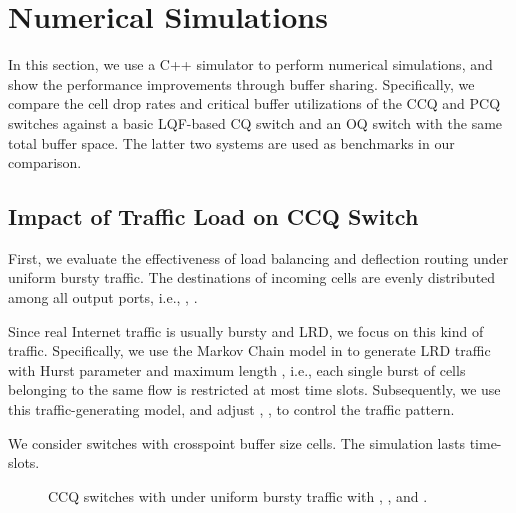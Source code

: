 \documentclass[journal,final,doublecolumn,10pt,twoside]{IEEEtranTCOM} \normalsize
\begin{document}
\section{Numerical Simulations}
\label{sec:simulation}
In this section, we use a C++ simulator to perform numerical simulations, and show the performance improvements through buffer sharing. Specifically, we compare the cell drop rates and critical buffer utilizations of the CCQ and PCQ switches against a basic LQF-based CQ switch and an OQ switch with the same total buffer space. The latter two systems are used as benchmarks in our comparison.








\subsection{Impact of Traffic Load on CCQ Switch}

First, we evaluate the effectiveness of load balancing and deflection routing under uniform bursty traffic. The destinations of incoming cells are evenly distributed among all  output ports, i.e., , .

Since real Internet traffic is usually bursty and LRD, we focus on this kind of traffic. Specifically, we use the Markov Chain model in \cite{LRD} to generate LRD traffic with Hurst parameter  and maximum length , i.e., each single burst of cells belonging to the same flow is restricted at most  time slots. Subsequently, we use this traffic-generating model, and adjust , ,  to control the traffic pattern.

We consider  switches with crosspoint buffer size  cells. The simulation lasts  time-slots.



\begin{figure}[ht]
\begin{minipage}[t]{3.2 in}
\centering {}
\end{minipage}
\begin{minipage}[t]{3.2 in}
\centering {}
\end{minipage}
\caption{ CCQ switches with  under uniform bursty traffic with , , and .}
\label{fig:unif}
\end{figure}
\end{document}
